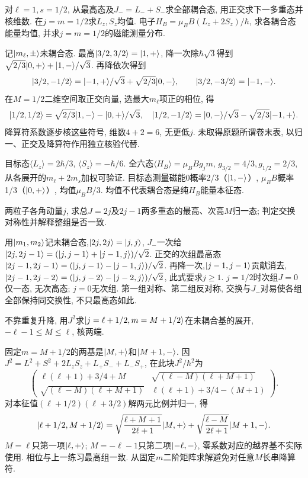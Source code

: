 \begin{exercise}
对$\ell=1,s=1/2$, 从最高态及$J_-=L_-+S_-$求全部耦合态, 用正交求下一多重态并核维数. 在$j=m=1/2$求$L_z,S_z$均值. 电子$H_B=\mu_BB(L_z+2S_z)/\hbar$, 求各耦合态能量均值, 并求$j=m=1/2$的磁能测量分布.
\end{exercise}
\begin{solution}
记$\lvert m_\ell,\pm\rangle$未耦合态. 最高$\lvert 3/2,3/2\rangle=\lvert 1,+\rangle$, 降一次除$\hbar\sqrt3$得到$\sqrt{2/3}\lvert 0,+\rangle+\lvert 1,-\rangle/\sqrt3$. 再降依次得到
\[
\lvert 3/2,-1/2\rangle=\lvert -1,+\rangle/\sqrt3+\sqrt{2/3}\lvert 0,-\rangle,\qquad
\lvert 3/2,-3/2\rangle=\lvert -1,-\rangle.
\]
在$M=1/2$二维空间取正交向量, 选最大$m_\ell$项正的相位, 得
\[
\lvert 1/2,1/2\rangle=\sqrt{2/3}\lvert 1,-\rangle-\lvert 0,+\rangle/\sqrt3,\quad
\lvert 1/2,-1/2\rangle=\lvert 0,-\rangle/\sqrt3-\sqrt{2/3}\lvert -1,+\rangle.
\]
降算符系数逐步核这些符号, 维数$4+2=6$, 无更低$j$. 未取得原题所谓卷末表, 以归一、正交及降算符作用独立核验代替.

目标态$\langle L_z\rangle=2\hbar/3$, $\langle S_z\rangle=-\hbar/6$. 全六态$\langle H_B\rangle=\mu_BBg_jm$, $g_{3/2}=4/3,g_{1/2}=2/3$, 从各展开的$m_\ell+2m_s$加权可验证. 目标态测量磁能0概率2/3（$\lvert 1,-\rangle$）, $\mu_BB$概率1/3（$\lvert 0,+\rangle$）, 均值$\mu_BB/3$. 均值不代表耦合态是纯$H_B$能量本征态.
\end{solution}
\begin{exercise}
两粒子各角动量$j$, 求总$J=2j$及$2j-1$两多重态的最高、次高$M$归一态; 判定交换对称性并解释整组是否一致.
\end{exercise}
\begin{solution}
用$\lvert m_1,m_2\rangle$记未耦合态,$\lvert 2j,2j\rangle=\lvert j,j\rangle$, $J_-$一次给$\lvert 2j,2j-1\rangle=(\lvert j,j-1\rangle+\lvert j-1,j\rangle)/\sqrt2$. 正交的次组最高态$\lvert 2j-1,2j-1\rangle=(\lvert j,j-1\rangle-\lvert j-1,j\rangle)/\sqrt2$. 再降一次,$\lvert j-1,j-1\rangle$贡献消去, $\lvert 2j-1,2j-2\rangle=(\lvert j,j-2\rangle-\lvert j-2,j\rangle)/\sqrt2$, 此式要求$j\ge1$. $j=1/2$时次组$J=0$仅一态, 无次高态; $j=0$无次组. 第一组对称、第二组反对称, 交换与$J_-$对易使各组全部保持同交换性, 不只最高态如此.
\end{solution}
\begin{exercise}
不靠重复升降, 用$J^2$求$\lvert j=\ell+1/2,m=M+1/2\rangle$在未耦合基的展开, $-\ell-1\le M\le\ell$, 核两端.
\end{exercise}
\begin{solution}
固定$m=M+1/2$的两基是$\lvert M,+\rangle$和$\lvert M+1,-\rangle$. 因$J^2=L^2+S^2+2L_zS_z+L_+S_-+L_-S_+$, 在此块$J^2/\hbar^2$为
\[
\begin{pmatrix}\ell(\ell+1)+3/4+M&\sqrt{(\ell-M)(\ell+M+1)}\\
\sqrt{(\ell-M)(\ell+M+1)}&\ell(\ell+1)+3/4-(M+1)\end{pmatrix}.
\]
对本征值$(\ell+1/2)(\ell+3/2)$解两元比例并归一, 得
\[
\lvert \ell+1/2,M+1/2\rangle=\sqrt{\frac{\ell+M+1}{2\ell+1}}\lvert M,+\rangle
+\sqrt{\frac{\ell-M}{2\ell+1}}\lvert M+1,-\rangle.
\]
$M=\ell$只第一项$\lvert \ell,+\rangle$; $M=-\ell-1$只第二项$\lvert -\ell,-\rangle$, 零系数对应的越界基不实际使用. 相位与上一练习最高组一致. 从固定$m$二阶矩阵求解避免对任意$M$长串降算符.
\end{solution}
